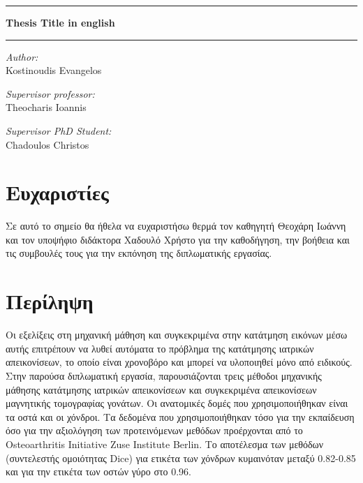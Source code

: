 \documentclass[a4paper,12pt]{article}
\newcommand{\HRule}{\rule{\linewidth}{0.5mm}}
\begin{document}
\begin{titlepage}

\begin{center}
    \HRule
    \vspace{0.4cm}
    { \huge \bfseries Thesis Title in english}
    \vspace{0.4cm}
    \HRule
    \vspace{1.5cm}

    \begin{minipage}{0.8\textwidth}
    \center
    \large
    \emph{Author:} \\ 
    \Large
    Kostinoudis Evangelos
    \end{minipage}
    \vspace{0.5cm}

    \begin{minipage}{0.8\textwidth}
        \center
        \large
        \emph{Supervisor professor:} \\ 
        \Large
        Theocharis Ioannis
    \end{minipage}
    \vspace{0.5cm}

    \begin{minipage}{0.8\textwidth}
        \center
        \large
        \emph{Supervisor PhD Student:} \\ 
        \Large
        Chadoulos Christos
    \end{minipage}
    \vspace{0.5cm}
\end{center}
\end{titlepage}

\section*{Ευχαριστίες}

Σε αυτό το σημείο θα ήθελα να ευχαριστήσω θερμά τον καθηγητή Θεοχάρη Ιωάννη και
τον υποψήφιο διδάκτορα Χαδουλό Χρήστο για την καθοδήγηση, την βοήθεια και τις
συμβουλές τους για την εκπόνηση της διπλωματικής εργασίας.


\section*{Περίληψη}

Οι εξελίξεις στη μηχανική μάθηση και συγκεκριμένα στην κατάτμηση εικόνων
μέσω αυτής επιτρέπουν να λυθεί αυτόματα το πρόβλημα της κατάτμησης ιατρικών
απεικονίσεων, το οποίο είναι χρονοβόρο και μπορεί να υλοποιηθεί μόνο από
ειδικούς. Στην παρούσα διπλωματική εργασία, παρουσιάζονται τρεις μέθοδοι
μηχανικής μάθησης κατάτμησης ιατρικών απεικονίσεων και συγκεκριμένα απεικονίσεων
μαγνητικής τομογραφίας γονάτων. Οι ανατομικές δομές που χρησιμοποιήθηκαν είναι
τα οστά και οι χόνδροι. Τα δεδομένα που χρησιμοποιήθηκαν τόσο για την εκπαίδευση
όσο για την αξιολόγηση των προτεινόμενων μεθόδων προέρχονται από το
Osteoarthritis Initiative Zuse Institute Berlin. Το αποτέλεσμα των μεθόδων
(συντελεστής ομοιότητας Dice) για ετικέτα των χόνδρων κυμαινόταν μεταξύ
0.82-0.85 και για την ετικέτα των οστών γύρο στο 0.96. 
\end{document}

